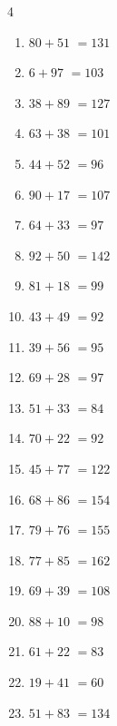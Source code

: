 \begin{multicols}{4}
\begin{enumerate}
  \item $80+51$
        $=131$

\columnbreak %

  \item $6+97$
        $=103$

  \item $38+89$
        $=127$

  \item $63+38$
        $=101$

  \item $44+52$
        $=96$

  \item $90+17$
        $=107$

  \item $64+33$
        $=97$

  \item $92+50$
        $=142$

  \item $81+18$
        $=99$

  \item $43+49$
        $=92$

  \item $39+56$
        $=95$

  \item $69+28$
        $=97$

  \item $51+33$
        $=84$

  \item $70+22$
        $=92$

  \item $45+77$
        $=122$

  \item $68+86$
        $=154$

  \item $79+76$
        $=155$

  \item $77+85$
        $=162$

  \item $69+39$
        $=108$

  \item $88+10$
        $=98$

  \item $61+22$
        $=83$

  \item $19+41$
        $=60$

  \item $51+83$
        $=134$


\end{enumerate}
\end{multicols}
